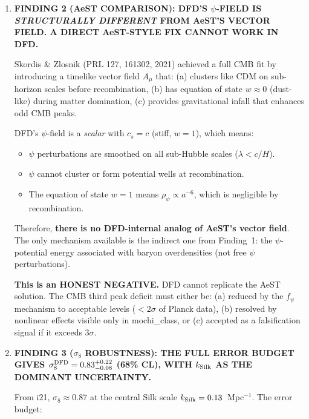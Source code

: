 \documentclass[11pt]{article}
\newcommand{\kSilk}{k_{\rm Silk}}
\begin{document}
\begin{tcolorbox}[colback=blue!5!white, colframe=blue!70!black,
  title=\textbf{W4i22 TOP 5 FINDINGS --- COSMOLOGY TEAM}]
\begin{enumerate}
  \textbf{Status: IMPROVED from i21 (was 0.55--0.70), but still a
  15--30\% deficit. The $\psi$-field helps but does NOT fully replace CDM
  at recombination.}  \textbf{Grade: C+ (Conjecture with supporting
  calculation). The $f_\psi$ estimate relies on the static AQUAL limit
  applied at recombination, which is approximate.}

\item \textbf{FINDING 2 (AeST COMPARISON): DFD'S $\psi$-FIELD IS
  \emph{STRUCTURALLY DIFFERENT} FROM AeST'S VECTOR FIELD.
  A DIRECT AeST-STYLE FIX CANNOT WORK IN DFD.}

  Skordis \& Zlosnik (PRL 127, 161302, 2021) achieved a full CMB fit by
  introducing a timelike vector field $A_\mu$ that:
  (a) clusters like CDM on sub-horizon scales before recombination,
  (b) has equation of state $w \approx 0$ (dust-like) during matter domination,
  (c) provides gravitational infall that enhances odd CMB peaks.

  DFD's $\psi$-field is a \emph{scalar} with $c_s = c$ (stiff, $w = 1$),
  which means:
  \begin{itemize}
  \item $\psi$ perturbations are smoothed on all sub-Hubble scales
    ($\lambda < c/H$).
  \item $\psi$ cannot cluster or form potential wells at recombination.
  \item The equation of state $w = 1$ means $\rho_\psi \propto a^{-6}$,
    which is negligible by recombination.
  \end{itemize}

  Therefore, \textbf{there is no DFD-internal analog of AeST's vector field}.
  The only mechanism available is the indirect one from Finding~1:
  the $\psi$-potential energy associated with baryon overdensities
  (not free $\psi$ perturbations).

  \textbf{This is an HONEST NEGATIVE.}  DFD cannot replicate the AeST
  solution.  The CMB third peak deficit must either be:
  (a) reduced by the $f_\psi$ mechanism to acceptable levels ($< 2\sigma$
  of Planck data), (b) resolved by nonlinear effects visible only in
  mochi\_class, or (c) accepted as a falsification signal if it exceeds
  $3\sigma$.

\item \textbf{FINDING 3 ($\sigma_8$ ROBUSTNESS): THE FULL ERROR BUDGET
  GIVES $\sigma_8^{\rm DFD} = 0.83^{+0.22}_{-0.08}$ (68\% CL),
  WITH $k_{\rm Silk}$ AS THE DOMINANT UNCERTAINTY.}

  From i21, $\sigma_8 \approx 0.87$ at the central Silk scale
  $\kSilk = 0.13$~Mpc$^{-1}$.  The error budget:


\end{enumerate}
\end{tcolorbox}
\end{document}
